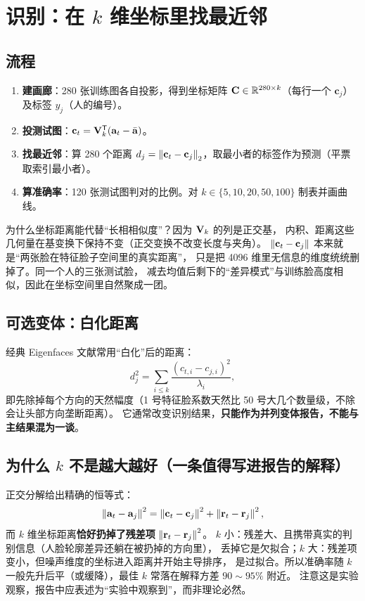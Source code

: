 \section{识别：在 $k$ 维坐标里找最近邻}

\subsection{流程}

\begin{enumerate}
  \item \textbf{建画廊}：280 张训练图各自投影，得到坐标矩阵 $\mathbf{C}\in\mathbb{R}^{280\times k}$（每行一个 $\mathbf{c}_j$）及标签 $y_j$（人的编号）。
  \item \textbf{投测试图}：$\mathbf{c}_t=\mathbf{V}_k^{\mathsf{T}}(\mathbf{a}_t-\bar{\mathbf{a}})$。
  \item \textbf{找最近邻}：算 280 个距离 $d_j=\left\lVert \mathbf{c}_t-\mathbf{c}_j \right\rVert_2$，取最小者的标签作为预测（平票取索引最小者）。
  \item \textbf{算准确率}：120 张测试图判对的比例。对 $k\in\{5,10,20,50,100\}$ 制表并画曲线。
\end{enumerate}

\begin{intuition}
为什么坐标距离能代替“长相相似度”？因为 $\mathbf{V}_k$ 的列是正交基，
内积、距离这些几何量在基变换下保持不变（正交变换不改变长度与夹角）。
$\left\lVert \mathbf{c}_t-\mathbf{c}_j \right\rVert$ 本来就是“两张脸在特征脸子空间里的真实距离”，
只是把 4096 维里无信息的维度统统删掉了。同一个人的三张测试脸，
减去均值后剩下的“差异模式”与训练脸高度相似，因此在坐标空间里自然聚成一团。
\end{intuition}

\subsection{可选变体：白化距离}

经典 Eigenfaces 文献常用“白化”后的距离：
\[
d_j^2=\sum_{i\le k}\frac{(c_{t,i}-c_{j,i})^2}{\lambda_i} ,
\]
即先除掉每个方向的天然幅度（1 号特征脸系数天然比 50 号大几个数量级，不除会让头部方向垄断距离）。
它通常改变识别结果，\textbf{只能作为并列变体报告，不能与主结果混为一谈}。

\subsection{为什么 $k$ 不是越大越好（一条值得写进报告的解释）}

正交分解给出精确的恒等式：
\[
\left\lVert \mathbf{a}_t-\mathbf{a}_j \right\rVert^2
=\left\lVert \mathbf{c}_t-\mathbf{c}_j \right\rVert^2+\left\lVert \mathbf{r}_t-\mathbf{r}_j \right\rVert^2 ,
\]
而 $k$ 维坐标距离\textbf{恰好扔掉了残差项} $\left\lVert \mathbf{r}_t-\mathbf{r}_j \right\rVert^2$。
$k$ 小：残差大、且携带真实的判别信息（人脸轮廓差异还躺在被扔掉的方向里），
丢掉它是欠拟合；$k$ 大：残差项变小，但噪声维度的坐标进入距离并开始主导排序，
是过拟合。所以准确率随 $k$ 一般先升后平（或缓降），最佳 $k$ 常落在解释方差 $90\sim95\%$ 附近。
注意这是实验观察，报告中应表述为“实验中观察到”，而非理论必然。
